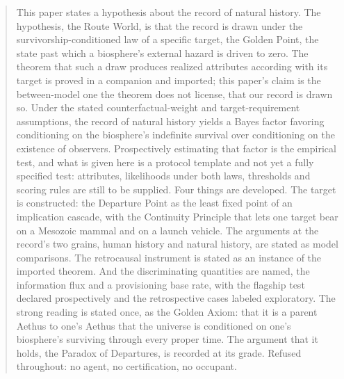 \begin{abstract}
This paper states a hypothesis about the record of natural history. The hypothesis, the Route World, is that the record is drawn under the survivorship-conditioned law of a specific target, the Golden Point, the state past which a biosphere's external hazard is driven to zero. The theorem that such a draw produces realized attributes according with its target is proved in a companion and imported; this paper's claim is the between-model one the theorem does not license, that our record is drawn so. Under the stated counterfactual-weight and target-requirement assumptions, the record of natural history yields a Bayes factor favoring conditioning on the biosphere's indefinite survival over conditioning on the existence of observers. Prospectively estimating that factor is the empirical test, and what is given here is a protocol template and not yet a fully specified test: attributes, likelihoods under both laws, thresholds and scoring rules are still to be supplied. Four things are developed. The target is constructed: the Departure Point as the least fixed point of an implication cascade, with the Continuity Principle that lets one target bear on a Mesozoic mammal and on a launch vehicle. The arguments at the record's two grains, human history and natural history, are stated as model comparisons. The retrocausal instrument is stated as an instance of the imported theorem. And the discriminating quantities are named, the information flux and a provisioning base rate, with the flagship test declared prospectively and the retrospective cases labeled exploratory. The strong reading is stated once, as the Golden Axiom: that it is a parent Aethus to one's Aethus that the universe is conditioned on one's biosphere's surviving through every proper time. The argument that it holds, the Paradox of Departures, is recorded at its grade. Refused throughout: no agent, no certification, no occupant.

\end{abstract}
